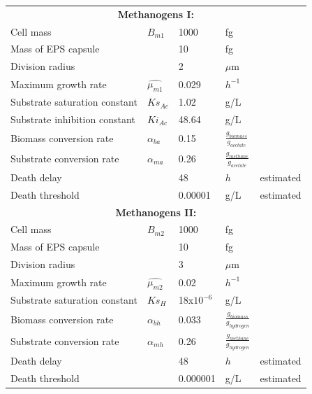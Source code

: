 \begin{table}
\begin{tabular}{|p{5cm}|p{1.2 cm}|p{1.2cm}|p{1.2cm}|p{3cm}|}
		\multicolumn{5}{|c|}{\textbf{Methanogens I:}} \\
		\cline{1-5}
		Cell mass 	 & $ B_{m1} $&1000 &fg&\cite{sowers1984methanosarcina}\\ \cline{1-5}
		Mass of EPS capsule   & &	10&fg&\cite{moletta1986dynamic}\\ \cline{1-5}
		Division radius  & 	&2&$\mu$m &\cite{sowers1984methanosarcina}\\ \cline{1-5}
		Maximum growth rate& $\hat{\mu_{m1}}$&	0.029&  $h^{-1}$&\cite{moletta1986dynamic, nishio1990methanogenesis}\\ \cline{1-5}
		Substrate saturation constant& $ Ks_{Ac} $&	1.02& g/L&\cite{moletta1986dynamic}\\ \cline{1-5}
        Substrate inhibition constant& $ Ki_{Ac} $ &	48.64&g/L&\cite{gavala2003kinetics, ibba1991two}  \\ \cline{1-5}
		Biomass conversion rate&$ \alpha_{ba}$&	0.15&$ \frac{g_{biomass}}{g_{acetate}}$ &\cite{nishio1990methanogenesis, kalyuzhnyi1997batch}\\ \cline{1-5}
		Substrate conversion rate&$ \alpha_{ma}$	&0.26 & $\frac{g_{methane}}{g_{acetate}}$&\cite{nishio1990methanogenesis}\\ \cline{1-5}
		Death delay&	&48 & $h$&estimated\\ \cline{1-5}
		Death threshold&	&0.00001 & g/L&estimated\\ \cline{1-5}
        
		\multicolumn{5}{|c|}{\textbf{Methanogens II:}} \\
		\cline{1-5}
		Cell mass 	 & $ B_{m2} $&1000 &fg&\cite{sowers1984methanosarcina}\\ \cline{1-5}
		Mass of EPS capsule   & &	10&fg&\cite{moletta1986dynamic}\\ \cline{1-5}
		Division radius  & 	&3&$\mu$m &\cite{sowers1984methanosarcina}\\ \cline{1-5}
		Maximum growth rate& $\hat{\mu_{m2}}$&	0.02&  $h^{-1}$&\cite{moletta1986dynamic, nishio1990methanogenesis}\\ \cline{1-5}
		Substrate saturation constant& $ Ks_{H} $& 18x$10^{-6}$& g/L&\cite{moletta1986dynamic}\\ \cline{1-5}
        Biomass conversion rate&$ \alpha_{bh}$&	0.033&$ \frac{g_{biomass}}{g_{hydrogen}}$ &\cite{nishio1990methanogenesis, kalyuzhnyi1997batch}\\ \cline{1-5}
		Substrate conversion rate&$ \alpha_{mh}$	&0.26 & $\frac{g_{methane}}{g_{hydrogen}}$&\cite{nishio1990methanogenesis}\\ \cline{1-5}
		Death delay&	&48 & $h$&estimated\\ \cline{1-5}
		Death threshold&	&0.000001 & g/L&estimated\\ \cline{1-5}
		
	
	\end{tabular}
	\label{parametersTable}
\end{table}

